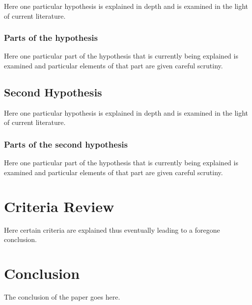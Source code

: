 Here one particular hypothesis is explained in depth
and is examined in the light of current literature.

\subsubsection{Parts of the hypothesis}

Here one particular part of the hypothesis that is 
currently being explained is examined and particular
elements of that part are given careful scrutiny.


\subsection{Second Hypothesis}

Here one particular hypothesis is explained in depth
and is examined in the light of current literature.

\subsubsection{Parts of the second hypothesis}

Here one particular part of the hypothesis that is 
currently being explained is examined and particular
elements of that part are given careful scrutiny.

\section{Criteria Review}

Here certain criteria are explained thus eventually
leading to a foregone conclusion.

\section{Conclusion}\label{conclusion}

The conclusion of the paper goes here.
\cite{buiEveryGeneratingPolytope2023}

